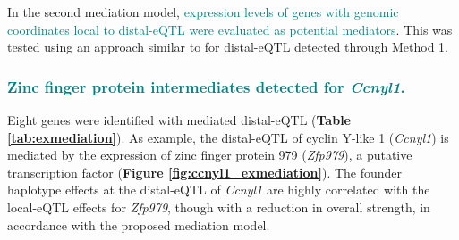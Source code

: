 \documentclass[9pt,twocolumn,twoside]{gsajnl}
\newcommand{\GKinline}[1]{\textcolor{teal}{#1}}
\begin{document}
In the second mediation model, \GKinline{expression levels of genes with genomic coordinates local to distal-eQTL were evaluated as potential mediators}. This was tested using an approach similar to \cite{Keller2018} for distal-eQTL detected through Method 1. 
\subsubsection{\GKinline{Zinc finger protein intermediates detected for \textit{Ccnyl1}.}}
Eight genes were identified with mediated distal-eQTL (\textbf{Table \ref{tab:exmediation}}). As example, the distal-eQTL of cyclin Y-like 1 (\textit{Ccnyl1}) is mediated by the expression of zinc finger protein 979 (\textit{Zfp979}), a putative transcription factor (\textbf{Figure \ref{fig:ccnyl1_exmediation}}). The founder haplotype effects at the distal-eQTL of \textit{Ccnyl1} are highly correlated with the local-eQTL effects for \textit{Zfp979}, though with a reduction in overall strength, in accordance with the proposed mediation model.
\end{document}
